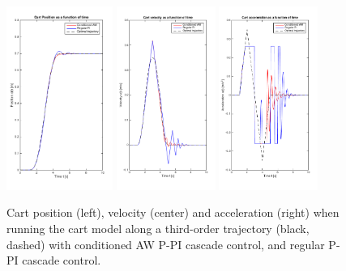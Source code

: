 \documentclass{article}
\begin{document}
\begin{figure}
\centering
\includegraphics[width = 0.3\linewidth,height=6cm]{figures/PositionAW.png}%
\includegraphics[width = 0.3\linewidth,height=6cm]{figures/VelocityAW.png}%
\includegraphics[width = 0.3\linewidth,height=6cm]{figures/AccelerationAW.png}
\caption{Cart position (left), velocity (center) and acceleration (right) when running the cart model along a third-order trajectory (black, dashed) with conditioned AW P-PI cascade control, and regular P-PI cascade control.}
\label{fig:AntiWindupResults}
\end{figure}
\end{document}
